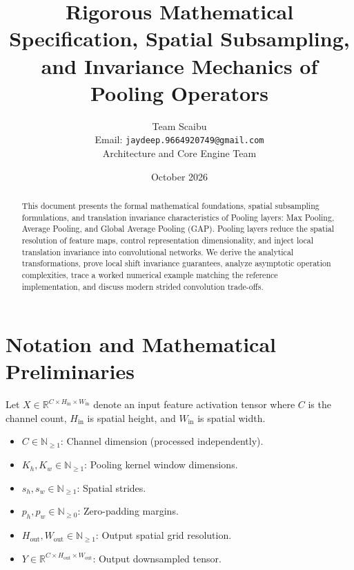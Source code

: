 \documentclass[11pt,a4paper]{article}
\title{\textbf{Rigorous Mathematical Specification, Spatial Subsampling, and Invariance Mechanics of Pooling Operators}}
\author{Team Scaibu \\ \small Email: \texttt{jaydeep.9664920749@gmail.com} \\ \small Architecture and Core Engine Team}
\date{October 2026}
\theoremstyle{definition}
\begin{document}
\maketitle

\begin{abstract}
This document presents the formal mathematical foundations, spatial subsampling formulations, and translation invariance characteristics of Pooling layers: Max Pooling, Average Pooling, and Global Average Pooling (GAP). Pooling layers reduce the spatial resolution of feature maps, control representation dimensionality, and inject local translation invariance into convolutional networks. We derive the analytical transformations, prove local shift invariance guarantees, analyze asymptotic operation complexities, trace a worked numerical example matching the reference implementation, and discuss modern strided convolution trade-offs.
\end{abstract}

\section{Notation and Mathematical Preliminaries}

Let $X \in \mathbb{R}^{C \times H_{\text{in}} \times W_{\text{in}}}$ denote an input feature activation tensor where $C$ is the channel count, $H_{\text{in}}$ is spatial height, and $W_{\text{in}}$ is spatial width.

\begin{itemize}
    \item $C \in \mathbb{N}_{\ge 1}$: Channel dimension (processed independently).
    \item $K_h, K_w \in \mathbb{N}_{\ge 1}$: Pooling kernel window dimensions.
    \item $s_h, s_w \in \mathbb{N}_{\ge 1}$: Spatial strides.
    \item $p_h, p_w \in \mathbb{N}_{\ge 0}$: Zero-padding margins.
    \item $H_{\text{out}}, W_{\text{out}} \in \mathbb{N}_{\ge 1}$: Output spatial grid resolution.
    \item $Y \in \mathbb{R}^{C \times H_{\text{out}} \times W_{\text{out}}}$: Output downsampled tensor.
\end{itemize}
\end{document}
